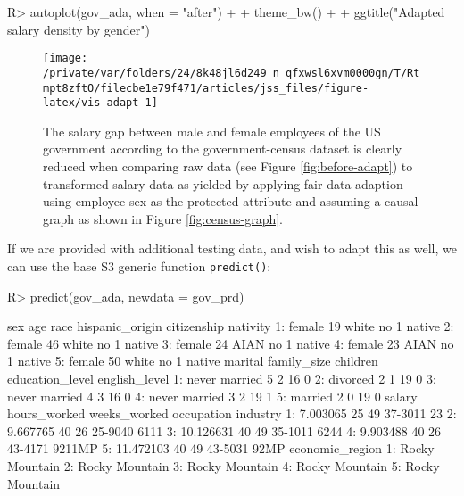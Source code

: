 \documentclass[
  nojss]{jss}
\begin{document}
\begin{CodeChunk}
\begin{CodeInput}
R> autoplot(gov_ada, when = "after") +
+   theme_bw() +
+   ggtitle("Adapted salary density by gender")
\end{CodeInput}
\begin{figure}

{\centering \texttt{[image: /private/var/folders/24/8k48jl6d249\_n\_qfxwsl6xvm0000gn/T/Rtmpt8zftO/filecbe1e79f471/articles/jss\_files/figure-latex/vis-adapt-1]} 

}

\caption{The salary gap between male and female employees of the US government according to the government-census dataset is clearly reduced when comparing raw data (see Figure \ref{fig:before-adapt}) to transformed salary data as yielded by applying fair data adaption using employee sex as the protected attribute and assuming a causal graph as shown in Figure \ref{fig:census-graph}.}\label{fig:vis-adapt}
\end{figure}
\end{CodeChunk}

If we are provided with additional testing data, and wish to adapt this
as well, we can use the base  S3 generic function
\texttt{predict()}:

\begin{CodeChunk}
\begin{CodeInput}
R> predict(gov_ada, newdata = gov_prd)
\end{CodeInput}
\begin{CodeOutput}
      sex age  race hispanic_origin citizenship nativity
1: female  19 white              no           1   native
2: female  46 white              no           1   native
3: female  24  AIAN              no           1   native
4: female  23  AIAN              no           1   native
5: female  50 white              no           1   native
         marital family_size children education_level english_level
1: never married           5        2              16             0
2:      divorced           2        1              19             0
3: never married           4        3              16             0
4: never married           3        2              19             1
5:       married           2        0              19             0
      salary hours_worked weeks_worked occupation industry
1:  7.003065           25           49    37-3011       23
2:  9.667765           40           26    25-9040     6111
3: 10.126631           40           49    35-1011     6244
4:  9.903488           40           26    43-4171   9211MP
5: 11.472103           40           49    43-5031     92MP
   economic_region
1:  Rocky Mountain
2:  Rocky Mountain
3:  Rocky Mountain
4:  Rocky Mountain
5:  Rocky Mountain
\end{CodeOutput}
\end{CodeChunk}
\end{document}
